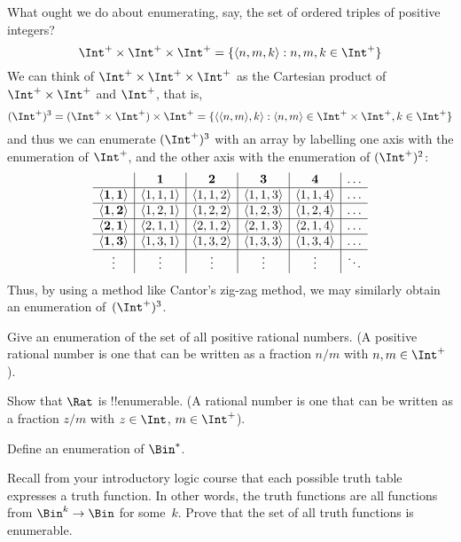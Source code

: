 \documentclass[../../../include/open-logic-section]{subfiles}
\begin{document}
\begin{explain}
What ought we do about enumerating, say, the set of ordered triples
of positive integers?
\[
\Int^+ \times \Int^+ \times \Int^+ = \Setabs{\tuple{n,m,k}}{n,m,k \in \Int^+}
\]
We can think of $\Int^+ \times \Int^+ \times \Int^+$ as the Cartesian
product of $\Int^+ \times \Int^+$ and $\Int^+$, that is,
\[
(\Int^+)^3 = (\Int^+ \times \Int^+) \times \Int^+ =
\Setabs{\tuple{\tuple{n,m},k}}{\tuple{n,m} \in \Int^+ \times \Int^+, k
  \in \Int^+ }
\]
and thus we can enumerate $(\Int^+)^3$ with an array by labelling one
axis with the enumeration of $\Int^+$, and the other axis with the
enumeration of $(\Int^+)^2$:
\[
\begin{array}{ c | c | c | c | c | c}
& \textbf 1 & \textbf 2 & \textbf 3 & \textbf 4 & \dots \\
\hline
\mathbf{\tuple{1,1}} & \tuple{1,1,1} & \tuple{1,1,2} & \tuple{1,1,3} & \tuple{1,1,4} & \dots \\
\hline
\mathbf{\tuple{1,2}} & \tuple{1,2,1} & \tuple{1,2,2} & \tuple{1,2,3} & \tuple{1,2,4} & \dots \\
\hline
\mathbf{\tuple{2,1}} & \tuple{2,1,1} & \tuple{2,1,2} & \tuple{2,1,3} & \tuple{2,1,4} & \dots \\
\hline
\mathbf{\tuple{1,3}} & \tuple{1,3,1} & \tuple{1,3,2} & \tuple{1,3,3} & \tuple{1,3,4} & \dots\\
\hline
\vdots & \vdots & \vdots & \vdots & \vdots & \ddots \\
\end{array}
\]
Thus, by using a method like Cantor's zig-zag method, we may
similarly obtain an enumeration of~$(\Int^+)^3$.
\end{explain}

\begin{prob}
Give an enumeration of the set of all positive rational numbers. (A
positive rational number is one that can be written as a fraction
$n/m$ with $n, m \in \Int^+$).
\end{prob}

\begin{prob}
Show that $\Rat$ is !!{enumerable}. (A rational number is one that can
be written as a fraction $z/m$ with $z \in \Int$, $m \in \Int^+$).
\end{prob}

\begin{prob}
Define an enumeration of $\Bin^*$.
\end{prob}

\begin{prob}
Recall from your introductory logic course that each possible truth
table expresses a truth function. In other words, the truth functions
are all functions from $\Bin^k \to \Bin$ for some~$k$. Prove that the
set of all truth functions is enumerable.
\end{prob}
\end{document}
